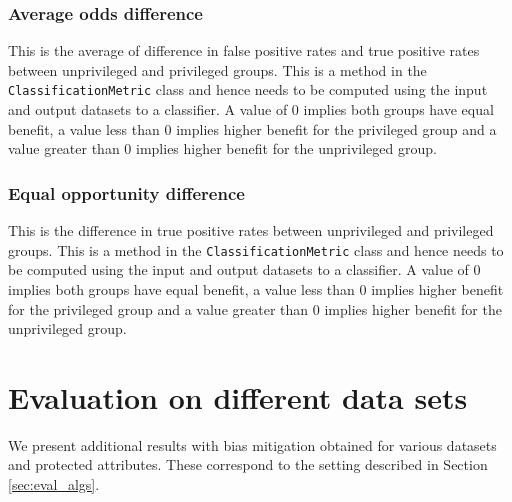 \documentclass{article}
\begin{document}
\subsubsection{Average odds difference}
This is the average of difference in false positive rates and true positive rates between unprivileged and privileged groups. This is a method in the \texttt{ClassificationMetric} class and hence needs to be computed using the input and output datasets to a classifier. A value of $0$ implies both groups have equal benefit, a value less than $0$ implies higher benefit for the privileged group and a value greater than $0$ implies higher benefit for the unprivileged group. 

\subsubsection{Equal opportunity difference}
This is the difference in true positive rates between unprivileged and privileged groups. This is a method in the \texttt{ClassificationMetric} class and hence needs to be computed using the input and output datasets to a classifier. A value of $0$ implies both groups have equal benefit, a value less than $0$ implies higher benefit for the privileged group and a value greater than $0$ implies higher benefit for the unprivileged group. 


%
\section{Evaluation on different data sets}
\label{appendix:evaluationgraphs}
We present additional results with bias mitigation obtained for various datasets and protected attributes. These correspond to the setting described in Section \ref{sec:eval_algs}.

\end{document}
